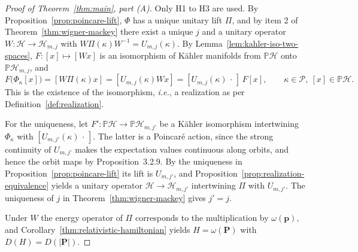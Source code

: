 \begin{proof}[Proof of Theorem~\ref{thm:main}, part (A)]
	Only H1 to H3 are used. By Proposition~\ref{prop:poincare-lift}, $\Phi$ has a unique unitary lift $\Pi$, and by item 2 of Theorem~\ref{thm:wigner-mackey} there exist a unique $j$ and a unitary operator $W:\mathcal{H}\to\mathcal{H}_{m,j}$ with $W\Pi(\kappa)W^{-1}=U_{m,j}(\kappa)$. By Lemma~\ref{lem:kahler-iso-two-spaces}, $F:[x]\mapsto[Wx]$ is an isomorphism of Kähler manifolds from $\mathbb{P}\mathcal{H}$ onto $\mathbb{P}\mathcal{H}_{m,j}$, and
	\begin{equation*}
		F\big(\Phi_\kappa[x]\big)=[W\Pi(\kappa)x]=[U_{m,j}(\kappa)Wx]=[U_{m,j}(\kappa)\,\cdot\,]\,F[x],\qquad \kappa\in\mathcal{P},\ [x]\in\mathbb{P}\mathcal{H}.
	\end{equation*}
	This is the existence of the isomorphism, \textit{i.e.}, a realization as per Definition~\ref{def:realization}.
	
	For the uniqueness, let $F':\mathbb{P}\mathcal{H}\to\mathbb{P}\mathcal{H}_{m,j'}$ be a Kähler isomorphism intertwining $\Phi_\kappa$ with $[U_{m,j'}(\kappa)\,\cdot\,]$. The latter is a Poincar\'e action, since the strong continuity of $U_{m,j'}$ makes the expectation values continuous along orbits, and hence the orbit maps by Proposition~3.2.9. By the uniqueness in Proposition~\ref{prop:poincare-lift} its lift is $U_{m,j'}$, and Proposition~\ref{prop:realization-equivalence} yields a unitary operator $\mathcal{H}\to\mathcal{H}_{m,j'}$ intertwining $\Pi$ with $U_{m,j'}$. The uniqueness of $j$ in Theorem~\ref{thm:wigner-mackey} gives $j'=j$.
	
	Under $W$ the energy operator of $\Pi$ corresponds to the multiplication by $\omega(\mathbf{p})$, and Corollary~\ref{thm:relativistic-hamiltonian} yields $H=\omega(\mathbf{P})$ with $D(H)=D(|\mathbf{P}|)$.
\end{proof}


